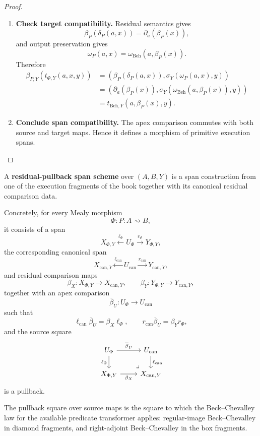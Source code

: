 \begin{proof}
\begin{enumerate}
  \item \textbf{Check target compatibility.}
  Residual semantics gives
  \[
    \beta_P(\delta_P(a,x))
    =
    \partial_a(\beta_P(x)),
  \]
  and output preservation gives
  \[
    \omega_P(a,x)
    =
    \omega_{\mathrm{Beh}}(a,\beta_P(x)).
  \]
  Therefore
  \[
  \begin{aligned}
    \beta_{P,Y}(t_{\Phi,Y}(a,x,y))
    &=
    \left(
      \beta_P(\delta_P(a,x)),
      \sigma_Y(\omega_P(a,x),y)
    \right)                                      \\
    &=
    \left(
      \partial_a(\beta_P(x)),
      \sigma_Y(\omega_{\mathrm{Beh}}(a,\beta_P(x)),y)
    \right)                                      \\
    &=
    t_{\mathrm{Beh},Y}(a,\beta_P(x),y).
  \end{aligned}
  \]

  \item \textbf{Conclude span compatibility.}
  The apex comparison commutes with both source and target maps.  Hence it
  defines a morphism of primitive execution spans.
\end{enumerate}
\end{proof}

\begin{definition}
\label{def:residual-pullback-span-scheme}
A \textbf{residual-pullback span scheme} over \((A,B,Y)\) is a span
construction from one of the execution fragments of the book together with
its canonical residual comparison data.

Concretely, for every Mealy morphism
\[
  \Phi:P:A\rightsquigarrow B,
\]
it consists of a span
\[
  X_{\Phi,Y}
  \xleftarrow{\ell_{\Phi}}
  U_{\Phi}
  \xrightarrow{r_{\Phi}}
  Y_{\Phi,Y},
\]
the corresponding canonical span
\[
  X_{\mathrm{can},Y}
  \xleftarrow{\ell_{\mathrm{can}}}
  U_{\mathrm{can}}
  \xrightarrow{r_{\mathrm{can}}}
  Y_{\mathrm{can},Y},
\]
and residual comparison maps
\[
  \beta_X:X_{\Phi,Y}\to X_{\mathrm{can},Y},
  \qquad
  \beta_Y:Y_{\Phi,Y}\to Y_{\mathrm{can},Y},
\]
together with an apex comparison
\[
  \overline{\beta}_U:U_{\Phi}\to U_{\mathrm{can}}
\]
such that
\[
  \ell_{\mathrm{can}}\overline{\beta}_U
  =
  \beta_X\ell_{\Phi},
  \qquad
  r_{\mathrm{can}}\overline{\beta}_U
  =
  \beta_Y r_{\Phi},
\]
and the source square
\[
\begin{tikzcd}
U_{\Phi}
  \arrow[r, "\overline{\beta}_U"]
  \arrow[d, "\ell_{\Phi}"']
&
U_{\mathrm{can}}
  \arrow[d, "\ell_{\mathrm{can}}"]
\\
X_{\Phi,Y}
  \arrow[r, "\beta_X"']
&
X_{\mathrm{can},Y}
  \arrow[ul, phantom, very near start, "\lrcorner"]
\end{tikzcd}
\]
is a pullback.

The pullback square over source maps is the square to which the
Beck--Chevalley law for the available predicate transformer applies:
regular-image Beck--Chevalley in diamond fragments, and right-adjoint
Beck--Chevalley in the box fragments.
\end{definition}

